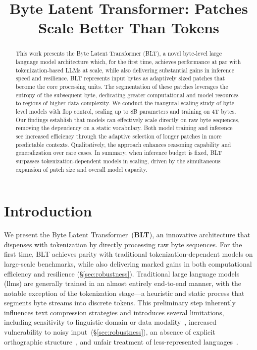 \title{Byte Latent Transformer: Patches Scale Better Than Tokens}

\begin{abstract}
This work presents the Byte Latent Transformer ({\textsc BLT}), a novel byte-level large language model architecture which, for the first time, achieves performance at par with tokenization-based LLMs at scale, while also delivering substantial gains in inference speed and resilience. {\textsc BLT} represents input bytes as adaptively sized patches that become the core processing units. The segmentation of these patches leverages the entropy of the subsequent byte, dedicating greater computational and model resources to regions of higher data complexity. We conduct the inaugural scaling study of byte-level models with flop control, scaling up to 8B parameters and training on 4T bytes. Our findings establish that models can effectively scale directly on raw byte sequences, removing the dependency on a static vocabulary. Both model training and inference see increased efficiency through the adaptive selection of longer patches in more predictable contexts. Qualitatively, the approach enhances reasoning capability and generalization over rare cases. In summary, when inference budget is fixed, {\textsc BLT} surpasses tokenization-dependent models in scaling, driven by the simultaneous expansion of patch size and overall model capacity.
\end{abstract}

\section{Introduction}
\label{section:intro}

We present the Byte Latent Transformer~(\textbf{BLT}), an innovative architecture that dispenses with tokenization by directly processing raw byte sequences. For the first time, BLT achieves parity with traditional tokenization-dependent models on large-scale benchmarks, while also delivering marked gains in both computational efficiency and resilience (\S\ref{sec:robustness}).
Traditional large language models (llms) are generally trained in an almost entirely end-to-end manner, with the notable exception of the tokenization stage—a heuristic and static process that segments byte streams into discrete tokens. This preliminary step inherently influences text compression strategies and introduces several limitations, including sensitivity to linguistic domain or data modality~\citep{dagangetting}, increased vulnerability to noisy input~(\S\ref{sec:robustness}), an absence of explicit orthographic structure~\citep{edman2024cute}, and unfair treatment of less-represented languages~\citep{liang2023xlm,petrov2024language,limisiewicz2024myte}.


